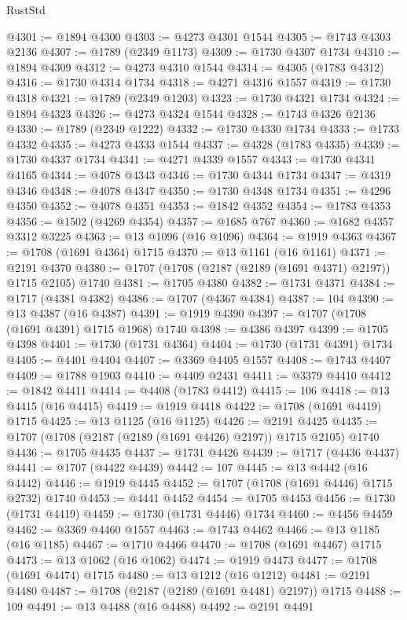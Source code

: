 \begin{lexlean}{RustStd}
\begin{coremodule}
@4301 := @1894 @4300
@4303 := @4273 @4301 @1544
@4305 := @1743 @4303 @2136
@4307 := @1789 (@2349 @1173)
@4309 := @1730 @4307 @1734
@4310 := @1894 @4309
@4312 := @4273 @4310 @1544
@4314 := @4305 (@1783 @4312)
@4316 := @1730 @4314 @1734
@4318 := @4271 @4316 @1557
@4319 := @1730 @4318
@4321 := @1789 (@2349 @1203)
@4323 := @1730 @4321 @1734
@4324 := @1894 @4323
@4326 := @4273 @4324 @1544
@4328 := @1743 @4326 @2136
@4330 := @1789 (@2349 @1222)
@4332 := @1730 @4330 @1734
@4333 := @1733 @4332
@4335 := @4273 @4333 @1544
@4337 := @4328 (@1783 @4335)
@4339 := @1730 @4337 @1734
@4341 := @4271 @4339 @1557
@4343 := @1730 @4341 @4165
@4344 := @4078 @4343
@4346 := @1730 @4344 @1734
@4347 := @4319 @4346
@4348 := @4078 @4347
@4350 := @1730 @4348 @1734
@4351 := @4296 @4350
@4352 := @4078 @4351
@4353 := @1842 @4352
@4354 := @1783 @4353
@4356 := @1502 (@4269 @4354)
@4357 := @1685 @767
@4360 := @1682 @4357 @3312 @3225
@4363 := @13 @1096 (@16 @1096)
@4364 := @1919 @4363
@4367 := @1708 (@1691 @4364) @1715
@4370 := @13 @1161 (@16 @1161)
@4371 := @2191 @4370
@4380 := @1707 (@1708 (@2187 (@2189 (@1691 @4371) @2197)) @1715 @2105) @1740
@4381 := @1705 @4380
@4382 := @1731 @4371
@4384 := @1717 (@4381 @4382)
@4386 := @1707 (@4367 @4384)
@4387 := 104
@4390 := @13 @4387 (@16 @4387)
@4391 := @1919 @4390
@4397 := @1707 (@1708 (@1691 @4391) @1715 @1968) @1740
@4398 := @4386 @4397
@4399 := @1705 @4398
@4401 := @1730 (@1731 @4364)
@4404 := @1730 (@1731 @4391) @1734
@4405 := @4401 @4404
@4407 := @3369 @4405 @1557
@4408 := @1743 @4407
@4409 := @1788 @1903
@4410 := @4409 @2431
@4411 := @3379 @4410
@4412 := @1842 @4411
@4414 := @4408 (@1783 @4412)
@4415 := 106
@4418 := @13 @4415 (@16 @4415)
@4419 := @1919 @4418
@4422 := @1708 (@1691 @4419) @1715
@4425 := @13 @1125 (@16 @1125)
@4426 := @2191 @4425
@4435 := @1707 (@1708 (@2187 (@2189 (@1691 @4426) @2197)) @1715 @2105) @1740
@4436 := @1705 @4435
@4437 := @1731 @4426
@4439 := @1717 (@4436 @4437)
@4441 := @1707 (@4422 @4439)
@4442 := 107
@4445 := @13 @4442 (@16 @4442)
@4446 := @1919 @4445
@4452 := @1707 (@1708 (@1691 @4446) @1715 @2732) @1740
@4453 := @4441 @4452
@4454 := @1705 @4453
@4456 := @1730 (@1731 @4419)
@4459 := @1730 (@1731 @4446) @1734
@4460 := @4456 @4459
@4462 := @3369 @4460 @1557
@4463 := @1743 @4462
@4466 := @13 @1185 (@16 @1185)
@4467 := @1710 @4466
@4470 := @1708 (@1691 @4467) @1715
@4473 := @13 @1062 (@16 @1062)
@4474 := @1919 @4473
@4477 := @1708 (@1691 @4474) @1715
@4480 := @13 @1212 (@16 @1212)
@4481 := @2191 @4480
@4487 := @1708 (@2187 (@2189 (@1691 @4481) @2197)) @1715
@4488 := 109
@4491 := @13 @4488 (@16 @4488)
@4492 := @2191 @4491

\end{coremodule}
\end{lexlean}
